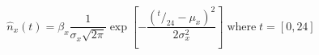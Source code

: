 \begin{equation}
\hat{n}_x(t) = \beta_x\frac{1}{\sigma_x\sqrt{2\pi}} \exp\left[-\frac{\left(^t/_{24}-\mu_x\right)^2}{2\sigma_x^2}\right] \;\text{where}\; t = [0, 24]
\label{ch4:equ:normal-distribution}
\end{equation}
